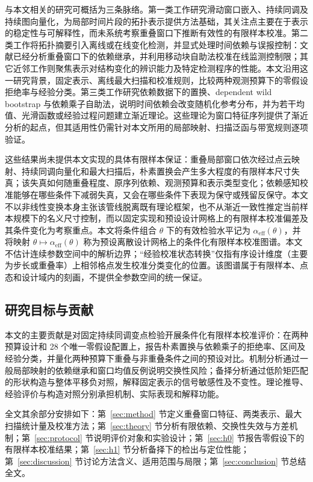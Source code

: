 与本文相关的研究可概括为三条脉络。第一类工作研究滑动窗口嵌入、持续同调及持续图向量化，为局部时间片段的拓扑表示提供方法基础\cite{PereaHarer2015,Adams2017}，其关注点主要在于表示的稳定性与可解释性，而未系统考察重叠窗口下推断有效性的有限样本校准。第二类工作将拓扑摘要引入离线或在线变化检测，并显式处理时间依赖与误报控制：文献\cite{NieYue2026}已经分析重叠窗口下的依赖继承，并利用移动块自助法校准在线监测控制限；其它近邻工作则聚焦表示对结构变化的辨识能力及特定检测程序的性能\cite{IslambekovYuvarajGel2020,ZhengMakXieXie2023,ChazalLevrardRoyer2024}。本文沿用这一研究背景，固定表示、离线最大扫描和校准规则，比较两种观测预算下的零假设拒绝率与经验分类。第三类工作研究依赖数据下的置换、dependent wild bootstrap 与依赖乘子自助法，说明时间依赖会改变随机化参考分布，并为若干均值、光滑函数或经验过程问题建立渐近理论\cite{RomanoTirlea2022,Shao2010,BucherKojadinovic2016}。这些理论为窗口特征序列提供了渐近分析的起点，但其适用性仍需针对本文所用的局部映射、扫描泛函与带宽规则逐项验证。

这些结果尚未提供本文实现的具体有限样本保证：重叠局部窗口依次经过点云映射、持续同调向量化和最大扫描后，朴素置换会产生多大程度的有限样本尺寸失真；该失真如何随重叠程度、原序列依赖、观测预算和表示类型变化；依赖感知校准能够在哪些条件下减弱失真，又会在哪些条件下表现为保守或残留反保守。本文不以非线性变换本身主张该管线脱离既有理论框架，也不从渐近一致性推定当前样本规模下的名义尺寸控制，而以固定实现和预设设计网格上的有限样本校准偏差及其条件变化为考察重点。本文将条件组合 $\theta$ 下的有效检验水平记为 $\alpha_{\mathrm{eff}}(\theta)$，并将映射 $\theta\mapsto\alpha_{\mathrm{eff}}(\theta)$ 称为预设离散设计网格上的条件化有限样本校准图谱。本文不估计连续参数空间中的解析边界；“经验校准状态转换”仅指有序设计维度（主要为步长或重叠率）上相邻格点发生校准分类变化的位置。该图谱属于有限样本、点态和设计域内的刻画，不提供全参数空间的统一保证。

\subsection{研究目标与贡献}\label{sec:intro-contrib}

本文的主要贡献是对固定持续同调变点检验开展条件化有限样本校准评价：在两种预算设计和 28 个唯一零假设配置上，报告朴素置换与依赖乘子的拒绝率、区间及经验分类，并量化两种预算下重叠与非重叠条件之间的预设对比。机制分析通过一般局部映射的依赖继承和窗口均值反例说明交换性风险；备择分析通过低阶矩匹配的形状构造与整体平移负对照，解释固定表示的信号敏感性及不变性。理论推导、经验评价与构造对照分别承担机制、实际表现和解释功能。

全文其余部分安排如下：第~\ref{sec:method} 节定义重叠窗口特征、两类表示、最大扫描统计量及校准方法；第~\ref{sec:theory} 节分析有限依赖、交换性失效与方差机制；第~\ref{sec:protocol} 节说明评价对象和实验设计；第~\ref{sec:h0} 节报告零假设下的有限样本校准结果；第~\ref{sec:h1} 节分析备择下的检出与定位性能；第~\ref{sec:discussion} 节讨论方法含义、适用范围与局限；第~\ref{sec:conclusion} 节总结全文。
